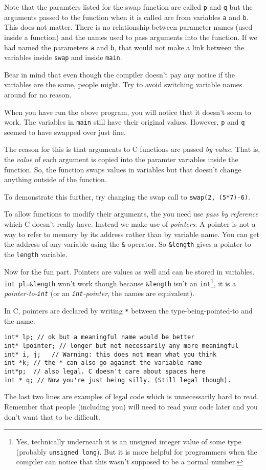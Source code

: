 Note that the paramters listed for the swap function are called \texttt{p} and \texttt{q} but the arguments passed to
the function when it is called are from variables \texttt{a} and \texttt{b}.
This does not matter. 
There is no relationship between parameter names (used inside a function) and the names used to pass arguments into 
the function.
If we had named the parameters \texttt{a} and \texttt{b}, that would not make a link between the variables inside \texttt{swap} 
and inside \texttt{main}.

Bear in mind that even though the compiler doesn't pay any notice if the variables are the same, people might.
Try to avoid switching variable names around for no reason.

When you have run the above program, you will notice that it doesn't seem to work.
The variables in \texttt{main} still have their original values.
However, \texttt{p} and \texttt{q} seemed to have swapped over just fine.

The reason for this is that arguments to C functions are passed \emph{by value}.
That is, the \emph{value} of each argument is copied into the paramter variables inside the function.
So, the function swaps values in variables but that doesn't change anything outside of the function.

To demonstrate this further, try changing the swap call to \lstinline!swap(2, (5*7)-6)!.

To allow functions to modify their arguments, the you need use \emph{pass by reference} which C doesn't really have.
Instead we make use of \emph{pointers}.
A pointer is not a way to refer to memory by its address rather than by variable name.
You can get the address of any variable using the \lstinline!&! operator.
So \lstinline!&length! gives a pointer to the \texttt{length} variable.

Now for the fun part.
Pointers are values as well and can be stored in variables.
\lstinline!int pl=&length! won't work though because \lstinline!&length! isn't an \texttt{int}\footnote{Yes, technically underneath it is an unsigned integer value of some type (probably \texttt{unsigned long}).
But it is more helpful for programmers when the compiler can notice that this wasn't supposed to be a normal number.}, 
it is a \emph{pointer-to-\texttt{int}} (or an \emph{\texttt{int}-pointer}, the names are equivalent).

In C, pointers are declared by writing \texttt{*} between the type-being-pointed-to and the name.
\begin{lstlisting}
int* lp; // ok but a meaningful name would be better
int* lpointer; // longer but not necessarily any more meaningful
int* i, j;   // Warning: this does not mean what you think
int *k;	// the * can also go against the variable name
int*p;	// also legal. C doesn't care about spaces here
int * q; // Now you're just being silly. (Still legal though).
\end{lstlisting}
The last two lines are examples of legal code which is unnecessarily hard to read.
Remember that people (including you) will need to read your code later and you don't want that to be difficult.

